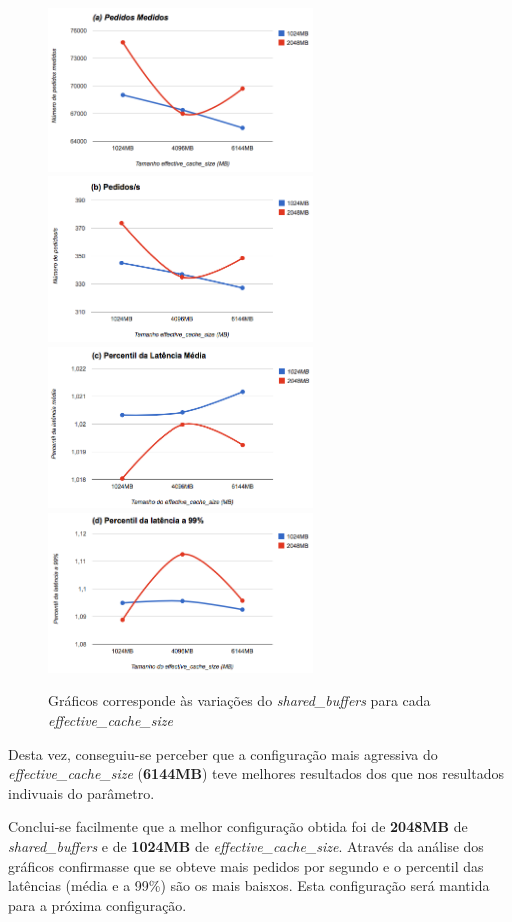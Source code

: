 \begin{figure}[ht!]
\centering
\includegraphics[width=70mm]{img/questao_3/sb_ecs_a.png}
\includegraphics[width=70mm]{img/questao_3/sb_ecs_b.png}
\includegraphics[width=70mm]{img/questao_3/sb_ecs_c.png}
\includegraphics[width=70mm]{img/questao_3/sb_ecs_d.png}
\caption{Gráficos corresponde às variações do \textit{shared\_buffers} para cada \textit{effective\_cache\_size}}
\end{figure}

Desta vez, conseguiu-se perceber que a configuração mais agressiva do \textit{effective\_cache\_size} (\textbf{6144MB}) teve melhores resultados dos que nos resultados indivuais do parâmetro.

Conclui-se facilmente que a melhor configuração obtida foi de \textbf{2048MB} de \textit{shared\_buffers} e de \textbf{1024MB} de \textit{effective\_cache\_size}. Através da análise dos gráficos confirmasse que se obteve mais pedidos por segundo e o percentil das latências (média e a 99\%) são os mais baisxos. Esta configuração será mantida para a próxima configuração.

